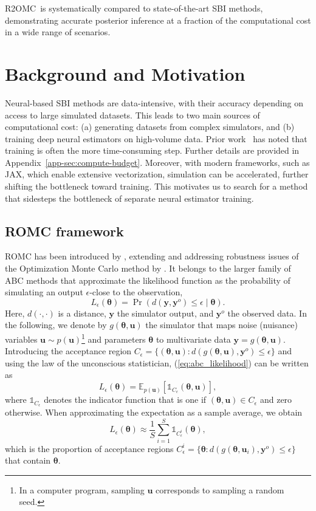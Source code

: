 \documentclass[twoside]{article}
\newcommand{\thb}{\boldsymbol{\theta}}
\newcommand{\ub}{\mathbf{u}}
\newcommand{\yb}{\mathbf{y}}
\newcommand{\data}{\mathbf{y}^o}
\newcommand{\accregioni}{C_{\epsilon}^i}
\newcommand{\E}{\mathbb{E}}
\newcommand{\rromc}{R2OMC}
\begin{document}
 \rromc~is systematically compared to state-of-the-art SBI methods, demonstrating accurate posterior inference at a fraction of the computational cost in a wide range of scenarios.

 \section{Background and Motivation}

 Neural-based SBI methods are data-intensive, with their accuracy depending on access to large simulated datasets.
 This leads to two main sources of computational cost:
 (a) generating datasets from complex simulators, and
 (b) training deep neural estimators on high-volume data.
 Prior work~\citep{lueckmann2021benchmarking} has noted that training is often the more time-consuming step.
 Further details are provided in Appendix~\ref{app-sec:compute-budget}.
Moreover, with modern frameworks, such as JAX, which enable extensive vectorization, simulation can be accelerated, further shifting the bottleneck toward training.
This motivates us to search for a method that sidesteps the bottleneck of separate neural estimator training.
 
\subsection{ROMC framework}
\label{subsec:ROMC}
ROMC has been introduced by \citet{ikonomov2020robust}, extending and addressing robustness issues of the Optimization Monte Carlo method by \citet{meeds2015optimization}. It belongs to the larger family of ABC methods that approximate the likelihood function as the probability of simulating an output $\epsilon$-close to the observation,
\begin{equation}
L_\epsilon(\thb) = \Pr(d(\yb, \data) \leq \epsilon \mid \thb).
\label{eq:abc_likelihood}
\end{equation}
Here, $d(\cdot, \cdot)$ is a distance, $\yb$ the simulator output, and $\data$ the observed data. In the following, we denote by $g(\thb, \ub)$ the simulator that maps noise (nuisance) variables $\ub \sim p(\ub)$\footnote{In a computer program, sampling $\ub$ corresponds to sampling a random seed.} and parameters $\thb$ to multivariate data $\yb = g(\thb, \ub)$. Introducing the acceptance region $C_\epsilon = \{(\thb, \ub): d(g(\thb, \ub), \data)\le \epsilon\}$ and using the law of the unconscious statistician, (\ref{eq:abc_likelihood}) can be written as
\begin{equation}
    L_\epsilon(\thb) = \E_{p(\ub)}\left[\mathbb{1}_{C_\epsilon}(\thb, \ub) \right],
\end{equation}
where $\mathbb{1}_{C_\epsilon}$ denotes the indicator function that is one if $(\thb, \ub)\in C_\epsilon$ and zero otherwise. When approximating the expectation as a sample average, we obtain
\begin{equation}
    L_\epsilon(\thb) \approx \frac{1}{S} \sum_{i=1}^S \mathbb{1}_{\accregioni}(\thb),
    \label{eq:omc_likelihood}
\end{equation}
which is the proportion of acceptance regions $\accregioni = \{\thb : d(g(\thb, \ub_i), \data) \leq \epsilon \}$ that contain $\thb$.
\end{document}
